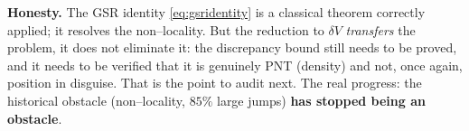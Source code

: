 \documentclass[11pt]{article}
\theoremstyle{plain}
\theoremstyle{definition}
\newcommand{\vv}{V}
\begin{document}
\noindent\textbf{Honesty.} The GSR identity \eqref{eq:gsridentity} is a classical
theorem correctly applied; it resolves the non--locality. But the reduction to
$\delta\vv$ \emph{transfers} the problem, it does not eliminate it: the discrepancy
bound still needs to be proved, and it needs to be verified that it is genuinely PNT
(density) and not, once again, position in disguise. That is the point to audit next.
The real progress: the historical obstacle (non--locality, $85\%$ large jumps)
\textbf{has stopped being an obstacle}.
\end{document}
